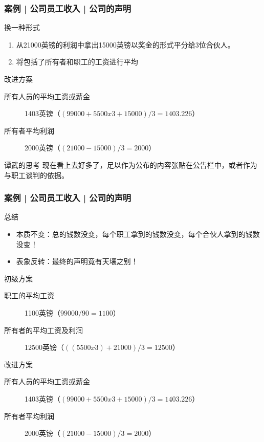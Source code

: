 \begin{frame}
  \frametitle{案例 | 公司员工收入 | 公司的声明}
  \begin{block}{换一种形式}
    \begin{enumerate}
      \item 从21000英镑的利润中拿出15000英镑以奖金的形式平分给3位合伙人。
      \item 将包括了所有者和职工的工资进行平均
    \end{enumerate}
  \end{block}
  \pause
  \begin{block}{改进方案}
    \begin{description}
      \item[所有人员的平均工资或薪金] 1403英镑（$(99000 + 5500 x 3 + 15000) / 3 = 1403.226$）
      \item[所有者平均利润] 2000英镑（$(21000 - 15000) / 3 = 2000$）
    \end{description}
  \end{block}
  \pause
  \begin{block}{谭武的思考}
    现在看上去好多了，足以作为公布的内容张贴在公告栏中，或者作为与职工谈判的依据。
  \end{block}
\end{frame}

\begin{frame}
  \frametitle{案例 | 公司员工收入 | 公司的声明}
  \begin{block}{总结}
    \begin{itemize}
      \item 本质不变：总的钱数没变，每个职工拿到的钱数没变，每个合伙人拿到的钱数没变！
      \item 表象反转：最终的声明竟有天壤之别！
    \end{itemize}
  \end{block}
  \pause
  \begin{block}{初级方案}
    \begin{description}
      \item[职工的平均工资] 1100英镑（$99000 / 90 = 1100$）
      \item[所有者的平均工资及利润] 12500英镑（$((5500 x 3) + 21000) / 3 = 12500$）
    \end{description}
  \end{block}
  \pause
  \begin{block}{改进方案}
    \begin{description}
      \item[所有人员的平均工资或薪金] 1403英镑（$(99000 + 5500 x 3 + 15000) / 3 = 1403.226$）
      \item[所有者平均利润] 2000英镑（$(21000 - 15000) / 3 = 2000$）
    \end{description}
  \end{block}
\end{frame}

